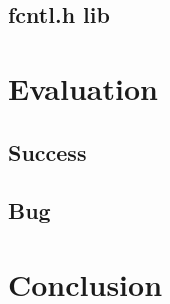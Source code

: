 \documentclass{article}
\begin{document}
\subsection{fcntl.h lib}

\section{Evaluation}
\subsection{Success}
\subsection{Bug}
\section{Conclusion}
\end{document}
